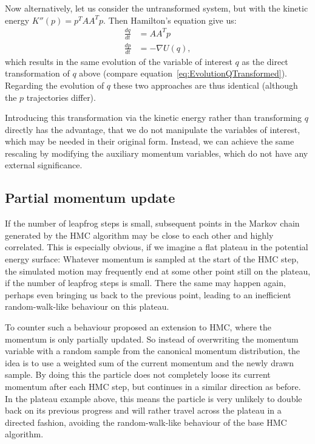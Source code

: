Now alternatively, let us consider the untransformed system, but with the kinetic energy $K''(p) = p^T A A^T p$. Then Hamilton's equation give us:
\begin{equation}
\begin{split}
\frac{dq}{dt} &= A A^T p \\
\frac{dp}{dt} &= - \nabla U(q),
\end{split}
\end{equation}
which results in the same evolution of the variable of interest $q$ as the direct transformation of $q$ above (compare equation~\eqref{eq:EvolutionQTransformed}). Regarding the evolution of $q$ these two approaches are thus identical (although the $p$ trajectories differ).

Introducing this transformation via the kinetic energy rather than transforming $q$ directly has the advantage, that we do not manipulate the variables of interest, which may be needed in their original form. Instead, we can achieve the same rescaling by modifying the auxiliary momentum variables, which do not have any external significance.

\subsection{Partial momentum update}
\label{sec:PartialMomentumUpdate}
If the number of leapfrog steps is small, subsequent points in the Markov chain generated by the HMC algorithm may be close to each other and highly correlated. This is especially obvious, if we imagine a flat plateau in the potential energy surface: Whatever momentum is sampled at the start of the HMC step, the simulated motion may frequently end at some other point still on the plateau, if the number of leapfrog steps is small. There the same may happen again, perhaps even bringing us back to the previous point, leading to an inefficient random-walk-like behaviour on this plateau.

To counter such a behaviour \textcite{Horowitz1991} proposed an extension to HMC, where the momentum is only partially updated. So instead of overwriting the momentum variable with a random sample from the canonical momentum distribution, the idea is to use a weighted sum of the current momentum and the newly drawn sample. By doing this the particle does not completely loose its current momentum after each HMC step, but continues in a similar direction as before. In the plateau example above, this means the particle is very unlikely to double back on its previous progress and will rather travel across the plateau in a directed fashion, avoiding the random-walk-like behaviour of the base HMC algorithm.


